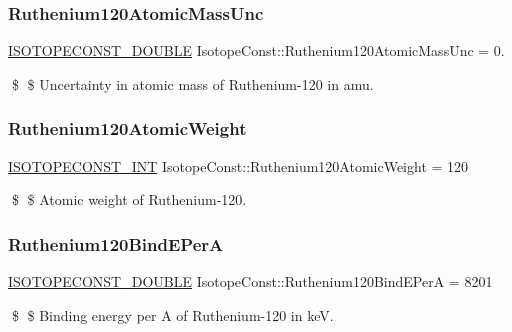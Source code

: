 \subsubsection{\texorpdfstring{Ruthenium120\+Atomic\+Mass\+Unc}{Ruthenium120AtomicMassUnc}}
{\footnotesize\ttfamily \mbox{\hyperlink{group___isotope_const-_macros_ga8f45a7272ce02c0b4c65c44636ed719a}{I\+S\+O\+T\+O\+P\+E\+C\+O\+N\+S\+T\+\_\+\+D\+O\+U\+B\+LE}} Isotope\+Const\+::\+Ruthenium120\+Atomic\+Mass\+Unc = 0.}

\$ \$ Uncertainty in atomic mass of Ruthenium-\/120 in amu. \mbox{\label{group___isotope_const-_ruthenium-_ru120_gad471e5d0f8d793a5ae9e91594bdf4e73}} 
\subsubsection{\texorpdfstring{Ruthenium120\+Atomic\+Weight}{Ruthenium120AtomicWeight}}
{\footnotesize\ttfamily \mbox{\hyperlink{group___isotope_const-_macros_ga5f18360b3e99483a35c32d789e62621c}{I\+S\+O\+T\+O\+P\+E\+C\+O\+N\+S\+T\+\_\+\+I\+NT}} Isotope\+Const\+::\+Ruthenium120\+Atomic\+Weight = 120}

\$ \$ Atomic weight of Ruthenium-\/120. \mbox{\label{group___isotope_const-_ruthenium-_ru120_gaf8b6753568b1d683d230b9311d1d135b}} 
\subsubsection{\texorpdfstring{Ruthenium120\+Bind\+E\+PerA}{Ruthenium120BindEPerA}}
{\footnotesize\ttfamily \mbox{\hyperlink{group___isotope_const-_macros_ga8f45a7272ce02c0b4c65c44636ed719a}{I\+S\+O\+T\+O\+P\+E\+C\+O\+N\+S\+T\+\_\+\+D\+O\+U\+B\+LE}} Isotope\+Const\+::\+Ruthenium120\+Bind\+E\+PerA = 8201}

\$ \$ Binding energy per A of Ruthenium-\/120 in keV. \mbox{\label{group___isotope_const-_ruthenium-_ru120_ga91540f82a409935923a3f007872805d0}} 
